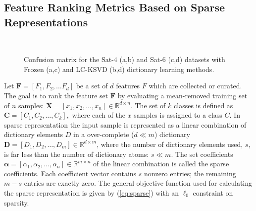 \subsection{Feature Ranking Metrics Based on Sparse Representations}
\label{ssec:FR_metric}





\begin{figure*}[!t]%
\centering
{}%
\qquad
{}\\
\label{fig: sat4_rslt}%


%
\qquad
{}
\caption[]{Confusion matrix for the Sat-4 (a,b) and Sat-6 (c,d) datasets with Frozen (a,c) and LC-KSVD (b,d) dictionary learning methods.}%
\label{fig: sat6_rslt}%
\end{figure*}






Let $\mathbf{F} = [F_1, F_2, \dots F_d]$ be a set of $d$ features $F$ which are collected or curated. The goal is to rank the feature set $\mathbf{F}$ by evaluating a mean-removed training set of $n$ samples: $\mathbf{\bar{X}} = [x_1, x_2, \dots, x_n] \in \mathbb{R}^{d \times n}$. The set of $k$ classes is defined as $\mathbf{C} = [C_1, C_2, \dots, C_k],$ where each of the $x$ samples is assigned to a class $C$. In sparse representation the input sample is represented as a linear combination of dictionary elements $D$ in a over-complete ($d \ll m$) dictionary $\mathbf{D} = [D_1, D_2, \dots, D_m] \in \mathbb{R}^{d \times m}$, where the number of dictionary elements used, $s$, is far less than the number of dictionary atoms: $s \ll m$. The set coefficients $\bm{\alpha} = [\alpha_1, \alpha_2, \dots, \alpha_n] \in \mathbb{R}^{m \times n}$ of the linear combination is called the sparse coefficients. Each coefficient vector contains $s$ nonzero entries; the remaining $m-s$ entries are exactly zero. The general objective function used for calculating the sparse representation is given by (\ref{eq:sparse}) with an $\ell_0$ constraint on sparsity.

